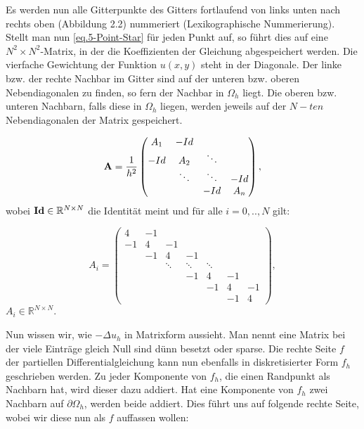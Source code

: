 \label{img.gridWithNumbers}

Es werden nun alle Gitterpunkte des Gitters fortlaufend von links unten nach rechts oben (Abbildung 2.2) nummeriert (Lexikographische Nummerierung). Stellt man nun \autoref{eq.5-Point-Star} für jeden Punkt auf, so führt dies auf eine $N^{2} \times N^{2}$-Matrix, in der die Koeffizienten der Gleichung abgespeichert werden. Die vierfache Gewichtung der Funktion $u(x,y)$ steht in der Diagonale. Der linke bzw. der rechte Nachbar im Gitter sind auf der unteren bzw. oberen Nebendiagonalen zu finden, so fern der Nachbar in $\Omega_{h}$ liegt. Die oberen bzw. unteren Nachbarn, falls diese in $\Omega_{h}$ liegen, werden jeweils auf der $N-ten$ Nebendiagonalen der Matrix gespeichert.

\begin{equation}
{\textbf{A}} = \frac{1}{h^{2}}
\begin{pmatrix}
A_{1} & -Id \\
-Id & A_{2} & \ddots \\
 & \ddots & \ddots & -Id \\
 & & -Id & A_{n}
\end{pmatrix},\label{eq.2D Matrix}
\end{equation}
wobei ${\textbf{Id}} \in \mathbb{R}^{N \times N}$ die Identität meint und für alle $i = 0,..,N$ gilt:

\begin{equation}
A_{i} =
\begin{pmatrix}
4 & -1\\
-1 & 4 & -1\\
   & -1 & 4 & -1\\
   &    & \ddots & \ddots & \ddots\\
   &    &        & -1 & 4 & -1\\
   &    &        &    & -1 & 4 & -1\\
   &    &        &    &    & -1 & 4
\end{pmatrix},
\end{equation}
$A_{i} \in \mathbb{R}^{N \times N}$.

Nun wissen wir, wie $-\Delta u_{h}$ in Matrixform aussieht. Man nennt eine Matrix bei der viele Einträge gleich Null sind dünn besetzt oder sparse. Die rechte Seite $f$ der partiellen Differentialgleichung kann nun ebenfalls in diskretisierter Form $f_{h}$ geschrieben werden. Zu jeder Komponente von $f_{h}$, die einen Randpunkt als Nachbarn hat, wird dieser dazu addiert. Hat eine Komponente von $f_{h}$ zwei Nachbarn auf $\partial \Omega_{h}$, werden beide addiert. Dies führt uns auf folgende rechte Seite, wobei wir diese nun als $f$ auffassen wollen:

